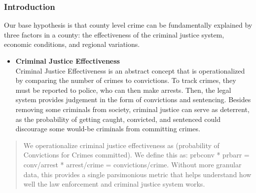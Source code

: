 \documentclass[]{article}
\newenvironment{Shaded}{}{}
\newcommand{\NormalTok}[1]{#1}
\newcommand{\OperatorTok}[1]{#1}
\newcommand{\StringTok}[1]{\textcolor[rgb]{0.00,0.50,0.50}{#1}}
\providecommand{\tightlist}{%
  \setlength{\itemsep}{0pt}\setlength{\parskip}{0pt}}
\begin{document}
\hypertarget{introduction-1}{%
\subsubsection{Introduction}\label{introduction-1}}

Our base hypothesis is that county level crime can be fundamentally
explained by three factors in a county: the effectiveness of the
criminal justice system, economic conditions, and regional variations.

\begin{itemize}
\tightlist
\item
  \textbf{Criminal Justice Effectiveness}\\
  Criminal Justice Effectiveness is an abstract concept that is
  operationalized by comparing the number of crimes to convictions. To
  track crimes, they must be reported to police, who can then make
  arrests. Then, the legal system provides judgement in the form of
  convictions and sentencing. Besides removing some criminals from
  society, criminal justice can serve as deterrent, as the probability
  of getting caught, convicted, and sentenced could discourage some
  would-be criminals from committing crimes.
\end{itemize}

\begin{quote}
We operationalize criminal justice effectiveness as (probability of
Convictions for Crimes committed). We define this as: prbconv * prbarr =
conv/arrest * arrest/crime = convictions/crime. Without more granular
data, this provides a single parsimonious metric that helps understand
how well the law enforcement and criminal justice system works.
\end{quote}

\begin{Shaded}
\end{Shaded}
\end{document}
